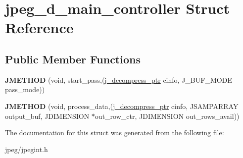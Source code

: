 \hypertarget{structjpeg__d__main__controller}{}\section{jpeg\+\_\+d\+\_\+main\+\_\+controller Struct Reference}
\label{structjpeg__d__main__controller}
\subsection*{Public Member Functions}
\begin{DoxyCompactItemize}
\item 
{\bfseries J\+M\+E\+T\+H\+OD} (void, start\+\_\+pass,(\hyperlink{structjpeg__decompress__struct}{j\+\_\+decompress\+\_\+ptr} cinfo, J\+\_\+\+B\+U\+F\+\_\+\+M\+O\+DE pass\+\_\+mode))\hypertarget{structjpeg__d__main__controller_a6fd68ad0d0296dcc299119db1128c294}{}\label{structjpeg__d__main__controller_a6fd68ad0d0296dcc299119db1128c294}

\item 
{\bfseries J\+M\+E\+T\+H\+OD} (void, process\+\_\+data,(\hyperlink{structjpeg__decompress__struct}{j\+\_\+decompress\+\_\+ptr} cinfo,                   J\+S\+A\+M\+P\+A\+R\+R\+AY output\+\_\+buf, J\+D\+I\+M\+E\+N\+S\+I\+ON $\ast$out\+\_\+row\+\_\+ctr,                   J\+D\+I\+M\+E\+N\+S\+I\+ON out\+\_\+rows\+\_\+avail))\hypertarget{structjpeg__d__main__controller_adf8de05e4c6182ec02c782faa67cb650}{}\label{structjpeg__d__main__controller_adf8de05e4c6182ec02c782faa67cb650}

\end{DoxyCompactItemize}


The documentation for this struct was generated from the following file\+:\begin{DoxyCompactItemize}
\item 
jpeg/jpegint.\+h\end{DoxyCompactItemize}
